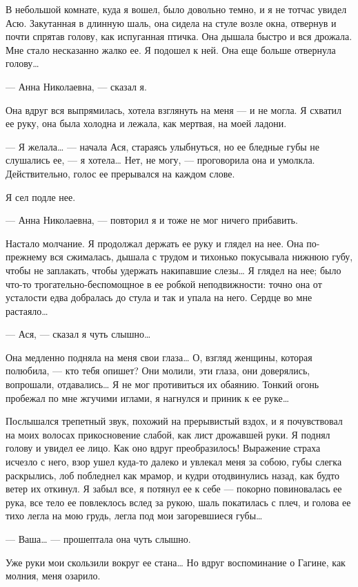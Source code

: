 В небольшой комнате, куда я вошел, было довольно темно, и я не тотчас увидел Асю. Закутанная в длинную шаль, она сидела на стуле возле окна, отвернув и почти спрятав голову, как испуганная птичка. Она дышала быстро и вся дрожала. Мне стало несказанно жалко ее. Я подошел к ней. Она еще больше отвернула голову…

— Анна Николаевна, — сказал я.

Она вдруг вся выпрямилась, хотела взглянуть на меня — и не могла. Я схватил ее руку, она была холодна и лежала, как мертвая, на моей ладони.

— Я желала… — начала Ася, стараясь улыбнуться, но ее бледные губы не слушались ее, — я хотела… Нет, не могу, — проговорила она и умолкла. Действительно, голос ее прерывался на каждом слове.

Я сел подле нее.

— Анна Николаевна, — повторил я и тоже не мог ничего прибавить.

Настало молчание. Я продолжал держать ее руку и глядел на нее. Она по-прежнему вся сжималась, дышала с трудом и тихонько покусывала нижнюю губу, чтобы не заплакать, чтобы удержать накипавшие слезы… Я глядел на нее; было что-то трогательно-беспомощное в ее робкой неподвижности: точно она от усталости едва добралась до стула и так и упала на него. Сердце во мне растаяло…

— Ася, — сказал я чуть слышно…

Она медленно подняла на меня свои глаза… О, взгляд женщины, которая полюбила, — кто тебя опишет? Они молили, эти глаза, они доверялись, вопрошали, отдавались… Я не мог противиться их обаянию. Тонкий огонь пробежал по мне жгучими иглами, я нагнулся и приник к ее руке…

Послышался трепетный звук, похожий на прерывистый вздох, и я почувствовал на моих волосах прикосновение слабой, как лист дрожавшей руки. Я поднял голову и увидел ее лицо. Как оно вдруг преобразилось! Выражение страха исчезло с него, взор ушел куда-то далеко и увлекал меня за собою, губы слегка раскрылись, лоб побледнел как мрамор, и кудри отодвинулись назад, как будто ветер их откинул. Я забыл все, я потянул ее к себе — покорно повиновалась ее рука, все тело ее повлеклось вслед за рукою, шаль покатилась с плеч, и голова ее тихо легла на мою грудь, легла под мои загоревшиеся губы…

— Ваша… — прошептала она чуть слышно.

Уже руки мои скользили вокруг ее стана… Но вдруг воспоминание о Гагине, как молния, меня озарило.

